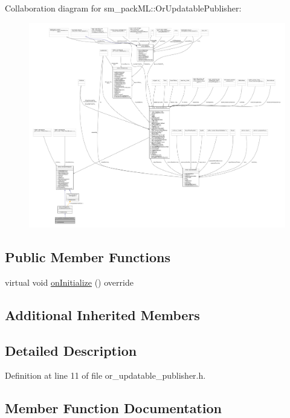 Collaboration diagram for sm\+\_\+pack\+ML\+:\+:Or\+Updatable\+Publisher\+:
\nopagebreak
\begin{figure}[H]
\begin{center}
\leavevmode
\includegraphics[width=350pt]{classsm__packML_1_1OrUpdatablePublisher__coll__graph}
\end{center}
\end{figure}
\subsection*{Public Member Functions}
\begin{DoxyCompactItemize}
\item 
virtual void \hyperlink{classsm__packML_1_1OrUpdatablePublisher_af96ca3d9ef520a93e0497745ac0270d0}{on\+Initialize} () override
\end{DoxyCompactItemize}
\subsection*{Additional Inherited Members}


\subsection{Detailed Description}


Definition at line 11 of file or\+\_\+updatable\+\_\+publisher.\+h.



\subsection{Member Function Documentation}
\mbox{\label{classsm__packML_1_1OrUpdatablePublisher_af96ca3d9ef520a93e0497745ac0270d0}} 

